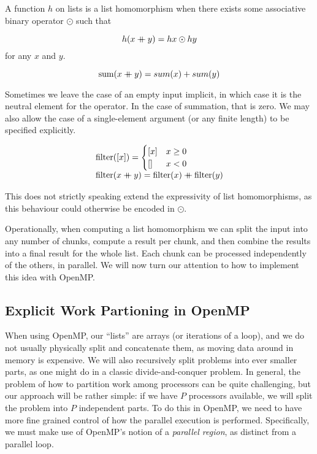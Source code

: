 \begin{definition}
  A function $h$ on lists is a list homomorphism when there exists
  some associative binary operator $\odot{}$ such that

\[
  h (x \mathbin{+\mkern-10mu+} y) = h x \odot h y
\]
for any $x$ and $y$.
\end{definition}

\begin{example}[Summation is a list homomorphism with $\odot=+$]
  \[
    \textrm{sum}(x \mathbin{+\mkern-10mu+} y) = sum(x) + sum(y)
  \]
\end{example}

Sometimes we leave the case of an empty input implicit, in which case
it is the neutral element for the operator. In the case of summation,
that is zero. We may also allow the case of a single-element argument
(or any finite length) to be specified explicitly.

\begin{example}
  \[
    \begin{array}{l}
      \textrm{filter}([x]) =
      \begin{cases}
        [x] & x \geq 0 \\
        [] & x < 0 \
      \end{cases}\\
      \textrm{filter}(x \mathbin{+\mkern-10mu+} y) = \textrm{filter}(x) \mathbin{+\mkern-10mu+} \textrm{filter}(y)
    \end{array}
  \]
\end{example}


This does not strictly speaking extend the expressivity of list
homomorphisms, as this behaviour could otherwise be encoded in
$\odot$.

Operationally, when computing a list homomorphism we can split the
input into any number of chunks, compute a result per chunk, and then
combine the results into a final result for the whole list. Each chunk
can be processed independently of the others, in parallel. We will now
turn our attention to how to implement this idea with OpenMP.

\subsection{Explicit Work Partioning in OpenMP}

When using OpenMP, our ``lists'' are arrays (or iterations of a loop),
and we do not usually physically split and concatenate them, as moving
data around in memory is expensive. We will also recursively split
problems into ever smaller parts, as one might do in a classic
divide-and-conquer problem. In general, the problem of how to
partition work among processors can be quite challenging, but our
approach will be rather simple: if we have $P$ processors available,
we will split the problem into $P$ independent parts. To do this in
OpenMP, we need to have more fine grained control of how the parallel
execution is performed. Specifically, we must make use of OpenMP's
notion of a \emph{parallel region}, as distinct from a parallel loop.

